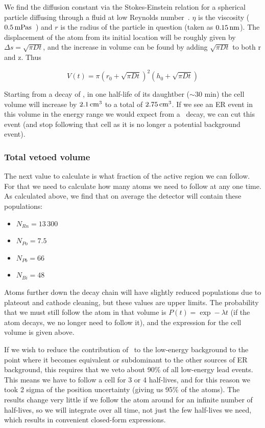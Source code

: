 We find the diffusion constant via the Stokes-Einstein relation for a spherical particle diffusing through a fluid at low Reynolds number~\cite{Sutherland:1905,Einstein:1905,Smoluchowski:1906}. $\eta$ is the viscosity ($0.5\,\mathrm{mPa s}$~\cite{Legros:1965}) and $r$ is the radius of the particle in question (taken as $0.15\,\mathrm{nm}$). The displacement of the atom from its initial location will be roughly given by $\Delta s = \sqrt{\pi Dt}$, and the increase in volume can be found by adding $\sqrt{\pi Dt}$ to both r and z. Thus

\begin{equation}
V(t) = \pi(r_0 + \sqrt{\pi Dt})^2(h_0 + \sqrt{\pi Dt})
\end{equation}

Starting from a decay of \Po, in one half-life of its daughtber ($\sim$30 min) the cell volume will increase by $2.1\,\mathrm{cm^3}$ to a total of $2.75\,\mathrm{cm^3}$. If we see an ER event in this volume in the energy range we would expect from a \Pb~decay, we can cut this event (and stop following that cell as it is no longer a potential background event).

\subsubsection{Total vetoed volume}

The next value to calculate is what fraction of the active region we can follow. For that we need to calculate how many atoms we need to follow at any one time. As calculated above, we find that on average the detector will contain these populations:
\begin{itemize}
    \item $N_{Rn} = 13\,300$
    \item $N_{Po} = 7.5$
    \item $N_{Pb} = 66$
    \item $N_{Bi} = 48$
\end{itemize}

Atoms further down the decay chain will have slightly reduced populations due to plateout and cathode cleaning, but these values are upper limits. The probability that we must still follow the atom in that volume is $P(t) = \exp -\lambda t$ (if the atom decays, we no longer need to follow it), and the expression for the cell volume is given above.

If we wish to reduce the contribution of \Pb~to the low-energy background to the point where it becomes equivalent or subdominant to the other sources of ER background, this requires that we veto about 90\% of all low-energy lead events. This means we have to follow a cell for 3 or 4 half-lives, and for this reason we took 2 sigma of the position uncertainty (giving us 95\% of the atoms). The results change very little if we follow the atom around for an infinite number of half-lives, so we will integrate over all time, not just the few half-lives we need, which results in convenient closed-form expressions.

